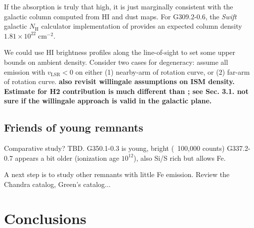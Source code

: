 \documentclass[preprint2,tighten,trackchanges]{aastex6}
\newcommand*{\mt}{\mathrm}
\newcommand*{\unit}[1]{\;\mt{#1}}  %
\newcommand*{\abt}{\mathord{\sim}} %
\newcommand*{\nH}{N_{\mathrm{H}}}
\newcommand*{\nHUnits}{\times 10^{22} \unit{cm^{-2}}}
\newcommand*{\AV}{A_{\mathrm{V}}}
\begin{document}
If the absorption is truly that high, it is just marginally consistent with
the galactic column computed from HI and dust maps.
For G309.2-0.6, the \textit{Swift} galactic $\nH$ calculator implementation of
\citet{willingale2013} provides an expected column density $1.81 \nHUnits$.

We could use HI brightness profiles along the line-of-sight to set some upper
bounds on ambient density.
Consider two cases for degeneracy: assume all emission with $v_{\mt{LSR}} < 0$
on either (1) nearby-arm of rotation curve, or (2) far-arm of rotation curve.
\textbf{also revisit willingale assumptions on ISM density.  Estimate for H2
contribution is much different than \citet{yamaguchi2012}; see Sec. 3.1.
not sure if the willingale approach is valid in the galactic plane.}





\subsection{Friends of young remnants}

Comparative study?  TBD.
G350.1-0.3 is young, bright (~100,000 counts)
G337.2-0.7 appears a bit older (ionization age $10^12$), also Si/S rich but
allows Fe.

A next step is to study other remnants with little Fe emission.
Review the Chandra catalog, Green's catalog...


\section{Conclusions}
\end{document}
